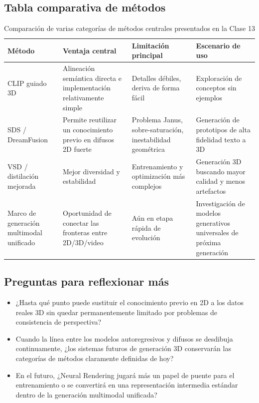 \documentclass[a4paper]{article}
\begin{document}
\subsection{Tabla comparativa de métodos}

\begin{table}[H]
\centering
\begin{tabular}{p{} p{} p{} p{}}
\toprule
Método & Ventaja central & Limitación principal & Escenario de uso \\
\midrule
CLIP guiado 3D & Alineación semántica directa e implementación relativamente simple & Detalles débiles, deriva de forma fácil & Exploración de conceptos sin ejemplos \\
SDS / DreamFusion & Permite reutilizar un conocimiento previo en difusos 2D fuerte & Problema Janus, sobre-saturación, inestabilidad geométrica & Generación de prototipos de alta fidelidad texto a 3D \\
VSD / distilación mejorada & Mejor diversidad y estabilidad & Entrenamiento y optimización más complejos & Generación 3D buscando mayor calidad y menos artefactos \\
Marco de generación multimodal unificado & Oportunidad de conectar las fronteras entre 2D/3D/video & Aún en etapa rápida de evolución & Investigación de modelos generativos universales de próxima generación \\
\bottomrule
\end{tabular}
\caption{Comparación de varias categorías de métodos centrales presentados en la Clase 13}
\end{table}

\subsection{Preguntas para reflexionar más}

\begin{itemize}
    \item ¿Hasta qué punto puede sustituir el conocimiento previo en 2D a los datos reales 3D sin quedar permanentemente limitado por problemas de consistencia de perspectiva?
    \item Cuando la línea entre los modelos autoregresivos y difusos se desdibuja continuamente, ¿los sistemas futuros de generación 3D conservarán las categorías de métodos claramente definidas de hoy?
    \item En el futuro, ¿Neural Rendering jugará más un papel de puente para el entrenamiento o se convertirá en una representación intermedia estándar dentro de la generación multimodal unificada?
\end{itemize}
\end{document}

